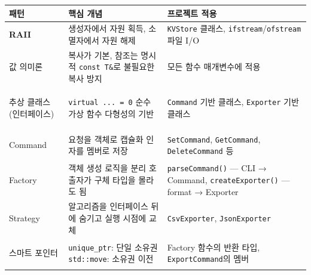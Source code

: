 \documentclass[11pt,a4paper]{book}
\newcommand{\code}[1]{\texttt{#1}}
\begin{document}
\begin{center}
\begin{longtable}{>{\bfseries}p{3cm} p{4cm} p{5.5cm}}
\toprule
패턴 & 핵심 개념 & 프로젝트 적용 \\
\midrule
\endhead

RAII &
생성자에서 자원 획득,\newline
소멸자에서 자원 해제 &
\code{KVStore} 클래스,\newline
\code{ifstream}/\code{ofstream} 파일 I/O \\
\midrule

값 의미론 &
복사가 기본, 참조는 명시적\newline
\code{const T\&}로 불필요한 복사 방지 &
모든 함수 매개변수에 적용 \\
\midrule

추상 클래스\newline(인터페이스) &
\code{virtual ... = 0} 순수 가상 함수\newline
다형성의 기반 &
\code{Command} 기반 클래스,\newline
\code{Exporter} 기반 클래스 \\
\midrule

Command &
요청을 객체로 캡슐화\newline
인자를 멤버로 저장 &
\code{SetCommand}, \code{GetCommand},\newline
\code{DeleteCommand} 등 \\
\midrule

Factory &
객체 생성 로직을 분리\newline
호출자가 구체 타입을 몰라도 됨 &
\code{parseCommand()} — CLI → Command,\newline
\code{createExporter()} — format → Exporter \\
\midrule

Strategy &
알고리즘을 인터페이스 뒤에 숨기고\newline
실행 시점에 교체 &
\code{CsvExporter}, \code{JsonExporter} \\
\midrule

스마트 포인터 &
\code{unique\_ptr}: 단일 소유권\newline
\code{std::move}: 소유권 이전 &
Factory 함수의 반환 타입,\newline
\code{ExportCommand}의 멤버 \\

\bottomrule
\end{longtable}
\end{center}

\end{document}
